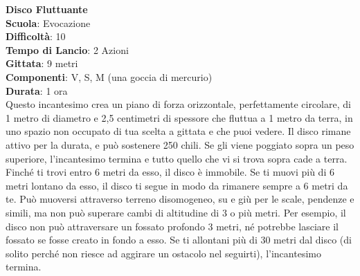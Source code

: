 \begin{multicols}{2}
\medskip\textbf{Disco Fluttuante}\\
\textbf{Scuola}: Evocazione\\
\textbf{Difficoltà}:  10\\
\textbf{Tempo di Lancio}: 2 Azioni\\
\textbf{Gittata}: 9 metri\\
\textbf{Componenti}: V, S, M (una goccia di mercurio)\\
\textbf{Durata}: 1 ora\\
Questo incantesimo crea un piano di forza orizzontale, perfettamente circolare, di 1 metro di diametro e 2,5 centimetri di spessore che fluttua a 1 metro da terra, in uno spazio non occupato di tua scelta a gittata e che puoi vedere. Il disco rimane attivo per la durata, e può sostenere 250 chili. Se gli viene poggiato sopra un peso superiore, l'incantesimo termina e tutto quello che vi si trova sopra cade a terra. Finché ti trovi entro 6 metri da esso, il disco è immobile. Se ti muovi più di 6 metri lontano da esso, il disco ti segue in modo da rimanere sempre a 6 metri da te. Può muoversi attraverso terreno disomogeneo, su e giù per le scale, pendenze e simili, ma non può superare cambi di altitudine di 3 o più metri. Per esempio, il disco non può attraversare un fossato profondo 3 metri, né potrebbe lasciare il fossato se fosse creato in fondo a esso. Se ti allontani più di 30 metri dal disco (di solito perché non riesce ad aggirare un ostacolo nel seguirti), l'incantesimo termina.


\end{multicols}
